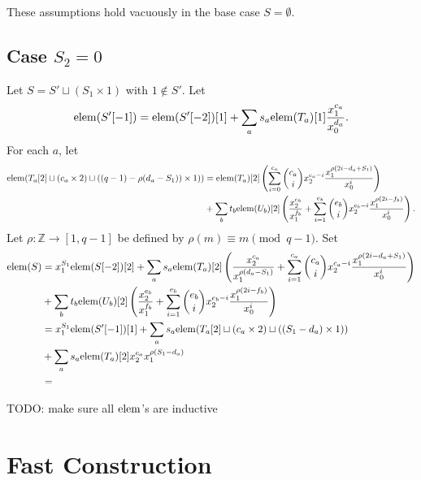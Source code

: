 \documentclass[12pt]{article}
\newcommand{\mb}[1]{\ensuremath{\mathbb{#1}}}
\newcommand{\ra}{\rightarrow}
\newcommand{\Z}{\mb{Z}}
\newcommand{\elem}{\ensuremath{{\rm elem}}}
\theoremstyle{plain}
\theoremstyle{definition}
\begin{document}
These assumptions hold vacuously in the base case $S = \emptyset$.



\subsection{Case \texorpdfstring{$S_2 = 0$}{S2 = 0}}
Let $S = S' \sqcup (S_1 \times 1)$ with $1 \notin S'$.  Let
\[
\elem(S'[-1]) = \elem(S'[-2])[1] + \sum_a s_a \elem(T_a)[1]\frac{x_1^{c_a}}{x_0^{d_a}}.
\]
For each $a$, let
\begin{align*}
\elem(T_a[2] \sqcup (c_a \times 2) \sqcup ((q-1) -\rho(d_a - S_1)) \times 1))
&= \elem(T_a)[2]\left(\sum_{i=0}^{c_a} \binom{c_a}{i} x_2^{c_a - i}\frac{x_1^{\rho(2i - d_a + S_1)}}{x_0^i}\right) \\
&+ \sum_b t_b \elem(U_b)[2]\left(\frac{x_2^{e_b}}{x_1^{f_b}} + \sum_{i=1}^{e_b} \binom{e_b}{i} x_2^{e_b - i}\frac{x_1^{\rho(2i - f_b)}}{x_0^i}\right).
\end{align*}
Let $\rho: \Z \ra [1, q-1]$ be defined by $\rho(m) \equiv m \pmod{q-1}$.  Set
\begin{align*}
\elem(S)
&= x_1^{S_1}\elem(S[-2])[2] + \sum_a s_a \elem(T_a)[2]\left(\frac{x_2^{c_a}}{x_1^{\rho(d_a - S_1)}} + \sum_{i=1}^{c_a} \binom{c_a}{i} x_2^{c_a - i}\frac{x_1^{\rho(2i - d_a + S_1)}}{x_0^i}\right) \\
&+ \sum_b t_b\elem(U_b)[2]\left(\frac{x_2^{e_b}}{x_1^{f_b}} + \sum_{i=1}^{e_b} \binom{e_b}{i} x_2^{e_b - i}\frac{x_1^{\rho(2i - f_b)}}{x_0^i}\right) \\
&= x_1^{S_1}\elem(S'[-1])[1] + \sum_a s_a \elem(T_a[2] \sqcup (c_a \times 2) \sqcup ((S_1 - d_a) \times 1)) \\
&+ \sum_a s_a \elem(T_a)[2]x_2^{c_a}x_1^{\rho(S_1 - d_a)} \\
&= 
\end{align*}


TODO: make sure all $\elem$'s are inductive


\section{Fast Construction}
\end{document}
